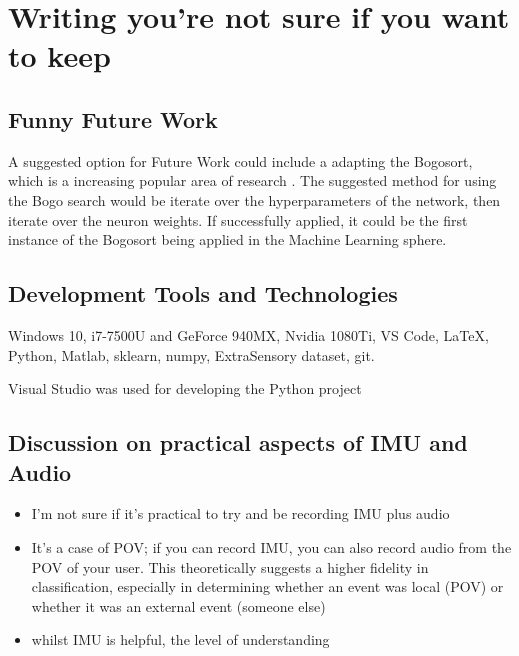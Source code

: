 \documentclass{UoNMCHA}
\numberwithin{equation}{section}
\begin{document}

\section{Writing you're not sure if you want to keep}


\subsection{Funny Future Work}
A suggested option for Future Work could include a adapting the Bogosort, which is a increasing popular area of research \cite{Bogo_Gruber2007} \cite{Bogo_Holzer2018} \cite{Bogo_max}. The suggested method for using the Bogo search would be iterate over the hyperparameters of the network, then iterate over the neuron weights. If successfully applied, it could be the first instance of the Bogosort being applied in the Machine Learning sphere.



\subsection{Development Tools and Technologies}
Windows 10, i7-7500U and GeForce 940MX, Nvidia 1080Ti, VS Code, LaTeX, Python, Matlab, sklearn, numpy, ExtraSensory dataset, git.

Visual Studio was used for developing the Python project

\subsection{Discussion on practical aspects of IMU and Audio}

\begin{itemize}
    \item I'm not sure if it's practical to try and be recording IMU plus audio
    \item It's a case of POV; if you can record IMU, you can also record audio from the POV of your user. This theoretically suggests a higher fidelity in classification, especially in determining whether an event was local (POV) or whether it was an external event (someone else)
    \item whilst IMU is helpful, the level of understanding
\end{itemize}
\end{document}
